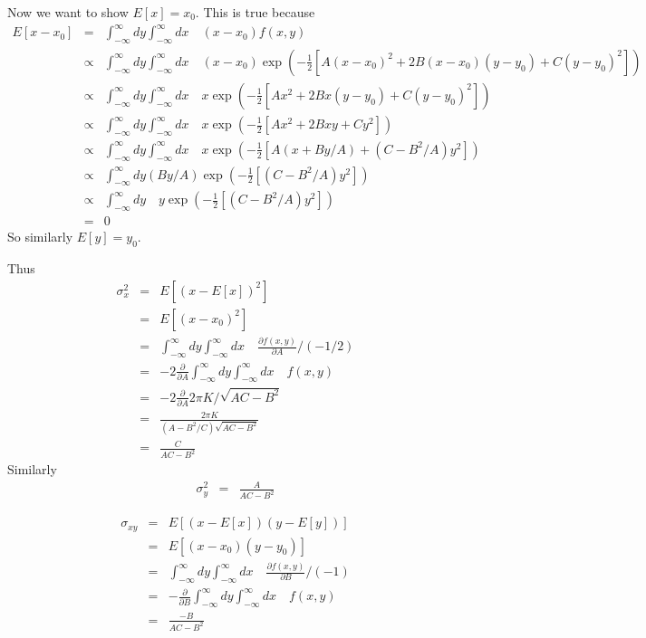 \documentclass[11pt]{article}
\begin{document}
Now we want to show $E[x]=x_0$. This is true because  
\begin{eqnarray*}
E[x - x_0] & = & \int_{-\infty}^{\infty} dy \int_{-\infty}^{\infty} dx \quad
(x-x_0) f(x,y) \\
& \propto & \int_{-\infty}^{\infty} dy \int_{-\infty}^{\infty} dx \quad
(x-x_0)  \exp \left(
 - \frac{1}{2} [ A(x-x_0)^2 + 2B(x-x_0)(y-y_0) + C(y-y_0)^2 ]  
 \right) \\
 & \propto & \int_{-\infty}^{\infty} dy \int_{-\infty}^{\infty} dx \quad
x  \exp \left(
 - \frac{1}{2} [ Ax^2 + 2Bx(y-y_0) + C(y-y_0)^2 ]  
 \right) \\ 
  & \propto & \int_{-\infty}^{\infty} dy \int_{-\infty}^{\infty} dx \quad
x  \exp \left(
 - \frac{1}{2} [ Ax^2 + 2Bxy + Cy^2 ]  
 \right) \\ 
   & \propto & \int_{-\infty}^{\infty} dy \int_{-\infty}^{\infty} dx \quad
x  \exp \left(
 - \frac{1}{2} [ A(x + By/A) + (C-B^2/A)y^2 ]  
 \right) \\ 
    & \propto & \int_{-\infty}^{\infty} dy (By/A)
\exp \left(
 - \frac{1}{2} [ (C-B^2/A)y^2 ]  
 \right) \\
   & \propto & \int_{-\infty}^{\infty} dy \quad y
\exp \left(
 - \frac{1}{2} [ (C-B^2/A)y^2 ]  
 \right) \\ 
 & = & 0
\end{eqnarray*}
So similarly $E[y]=y_0$. 

Thus
\begin{eqnarray*}
\sigma_x^2 & = & E[(x-E[x])^2] \\
       & = & E[(x-x_0)^2] \\
       & = & \int_{-\infty}^{\infty} dy \int_{-\infty}^{\infty} dx \quad 
       \frac{\partial f(x,y)}{\partial A} /(-1/2) \\
       & = & 
       -2 \frac{\partial  }{\partial A} \int_{-\infty}^{\infty} dy \int_{-\infty}^{\infty} dx \quad 
        f(x,y) \\
       & = & 
       -2 \frac{\partial  }{\partial A} 2 \pi K / \sqrt{ A C - B ^2} \\
         & = & 
\frac{2\pi K}{(A-B^2/C)\sqrt{AC-B^2}} \\
& =  & \frac{C}{A C - B ^2}
\end{eqnarray*}
Similarly
\begin{eqnarray*}
\sigma_y^2& =  & \frac{A}{A C - B ^2}
\end{eqnarray*}

\begin{eqnarray*}
\sigma_{xy} & = & E[(x-E[x])(y-E[y])] \\
       & = & E[(x-x_0)(y-y_0)] \\
       & = & \int_{-\infty}^{\infty} dy \int_{-\infty}^{\infty} dx \quad 
       \frac{\partial f(x,y)}{\partial B} /(-1) \\
       & = & 
       - \frac{\partial  }{\partial B} \int_{-\infty}^{\infty} dy \int_{-\infty}^{\infty} dx \quad 
        f(x,y) \\       
& =  & \frac{-B}{A C - B ^2}
\end{eqnarray*}
\end{document}
